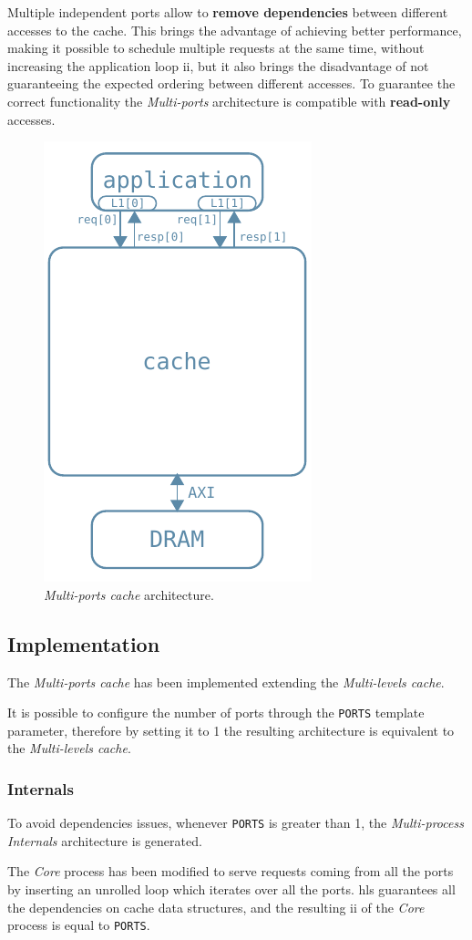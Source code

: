 \documentclass[11pt,a4paper,oneside]{memoir}
\begin{document}
\bigskip
Multiple independent ports allow to \textbf{remove dependencies} between
different accesses to the cache.
This brings the advantage of achieving better performance, making it possible
to schedule multiple requests at the same time, without increasing the
application loop \ac{ii}, but it also brings the disadvantage of not
guaranteeing the expected ordering between different accesses.
To guarantee the correct functionality the \emph{Multi-ports} architecture is
compatible with \textbf{read-only} accesses.

\begin{figure}[!htb]
	\centering
	\includegraphics[width=.3\textwidth]{multi_ports_arch}
	\caption{\emph{Multi-ports cache} architecture.}
	\label{fig:multi_ports_arch}
\end{figure}

\subsection{Implementation}
The \emph{Multi-ports cache} has been implemented extending the
\emph{Multi-levels cache}.

It is possible to configure the number of ports through the \texttt{PORTS}
template parameter, therefore by setting it to 1 the resulting architecture is
equivalent to the \emph{Multi-levels cache}.

\subsubsection{Internals}
To avoid dependencies issues, whenever \texttt{PORTS} is greater than 1, the
\emph{Multi-process} \emph{Internals} architecture is generated.

\bigskip
The \emph{Core} process has been modified to serve requests coming from all the
ports by inserting an unrolled loop which iterates over all the ports. \ac{hls}
guarantees all the dependencies on cache data structures, and the resulting
\ac{ii} of the \emph{Core} process is equal to \texttt{PORTS}.
\end{document}
